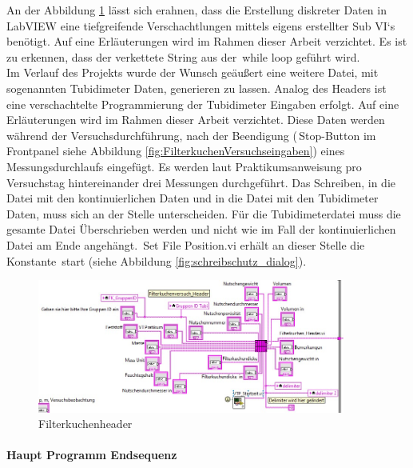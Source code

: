 An der Abbildung \ref{fig:filterkuchenheader} lässt sich erahnen, dass die Erstellung diskreter Daten in LabVIEW eine tiefgreifende Verschachtlungen mittels eigens erstellter Sub VI`s benötigt. Auf eine Erläuterungen wird im Rahmen dieser Arbeit verzichtet. Es ist zu erkennen, dass der verkettete String aus der \,{\Menlo while loop} geführt wird. \\

Im Verlauf des Projekts wurde der Wunsch geäußert eine weitere Datei, mit sogenannten Tubidimeter Daten, generieren zu lassen. Analog des Headers ist eine verschachtelte Programmierung der Tubidimeter Eingaben erfolgt. Auf eine Erläuterungen wird im Rahmen dieser Arbeit verzichtet. Diese Daten werden während der Versuchsdurchführung, nach der Beendigung (\,{\Menlo Stop}-Button im Frontpanel siehe Abbildung \ref{fig:FilterkuchenVersuchseingaben}) eines Messungsdurchlaufs eingefügt. Es werden laut Praktikumsanweisung pro Versuchstag hintereinander drei Messungen durchgeführt. Das Schreiben, in die Datei mit den kontinuierlichen Daten und in die Datei mit den Tubidimeter Daten, muss sich an der Stelle unterscheiden. Für die Tubidimeterdatei muss die gesamte Datei Überschrieben werden und nicht wie im Fall der kontinuierlichen Datei am Ende angehängt. \,{\Menlo Set File Position.vi} erhält an dieser Stelle die Konstante \,{\Menlo start} (siehe Abbildung \ref{fig:schreibschutz_dialog}).

\begin{figure}[h!] %
\centering
\includegraphics[width=0.9\textwidth]{Bilder/LabVIEW_serialport/Filterkuchenheader.jpg}
\vspace{0em}
 \caption[Filterkuchenheader]
{Filterkuchenheader}\label{fig:filterkuchenheader}
\end{figure}

\paragraph{Haupt Programm Endsequenz}

